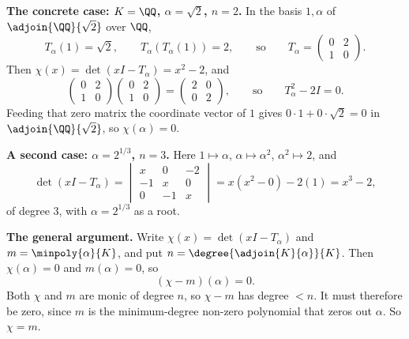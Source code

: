\documentclass[11pt]{article}
\begin{document}
\begin{solution}
  \textbf{The concrete case: $K = \QQ$, $\alpha = \sqrt{2}$, $n = 2$.} In the
  basis $1, \alpha$ of $\adjoin{\QQ}{\sqrt{2}}$ over $\QQ$,
  \[
    T_{\alpha}(1) = \sqrt{2}, \qquad T_{\alpha}(T_{\alpha}(1)) = 2,
    \qquad\text{so}\qquad
    T_{\alpha} = \begin{pmatrix} 0 & 2 \\ 1 & 0 \end{pmatrix}.
  \]
  Then $\chi(x) = \det(xI - T_{\alpha}) = x^{2} - 2$, and
  \[
    \begin{pmatrix} 0 & 2 \\ 1 & 0 \end{pmatrix}
    \begin{pmatrix} 0 & 2 \\ 1 & 0 \end{pmatrix}
    = \begin{pmatrix} 2 & 0 \\ 0 & 2 \end{pmatrix},
    \qquad\text{so}\qquad
    T_{\alpha}^{2} - 2I = 0 .
  \]
  Feeding that zero matrix the coordinate vector of $1$ gives
  $0 \cdot 1 + 0 \cdot \sqrt{2} = 0$ in $\adjoin{\QQ}{\sqrt{2}}$, so
  $\chi(\alpha) = 0$.

  \medskip
  \textbf{A second case: $\alpha = 2^{1/3}$, $n = 3$.} Here
  $1 \mapsto \alpha$, $\alpha \mapsto \alpha^{2}$, $\alpha^{2} \mapsto 2$, and
  \[
    \det(xI - T_{\alpha})
      = \begin{vmatrix} x & 0 & -2 \\ -1 & x & 0 \\ 0 & -1 & x \end{vmatrix}
      = x(x^{2} - 0) - 2(1)
      = x^{3} - 2,
  \]
  of degree $3$, with $\alpha = 2^{1/3}$ as a root.

  \medskip
  \textbf{The general argument.} Write $\chi(x) = \det(xI - T_{\alpha})$ and
  $m = \minpoly{\alpha}{K}$, and put $n = \degree{\adjoin{K}{\alpha}}{K}$. Then
  $\chi(\alpha) = 0$ and $m(\alpha) = 0$, so
  \[
    (\chi - m)(\alpha) = 0 .
  \]
  Both $\chi$ and $m$ are monic of degree $n$, so $\chi - m$ has degree
  $< n$. It must therefore be zero, since $m$ is the minimum-degree non-zero
  polynomial that zeros out $\alpha$. So $\chi = m$.
\end{solution}
\end{document}
